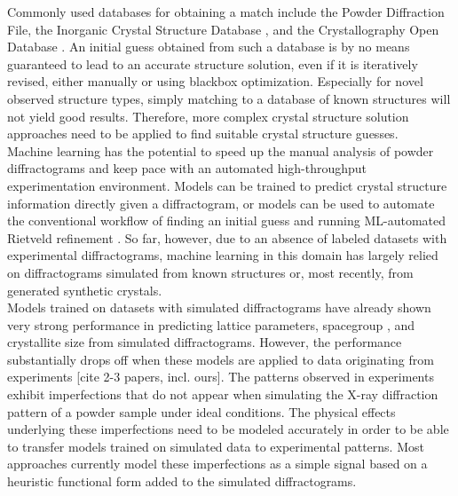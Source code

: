 Commonly used databases for obtaining a match include the Powder Diffraction File\cite{GatesRector2019}, the Inorganic Crystal Structure Database \cite{Belsky2002}, and the Crystallography Open Database \cite{Grazulis2009}. An initial guess obtained from such a database is by no means guaranteed to lead to an accurate structure solution, even if it is iteratively revised, either manually or using blackbox optimization\cite{Ozaki2020}. Especially for novel observed structure types, simply matching to a database of known structures will not yield good results. Therefore, more complex crystal structure solution approaches need to be applied to find suitable crystal structure guesses. \\

Machine learning has the potential to speed up the manual analysis of powder diffractograms and keep pace with an automated high-throughput experimentation environment\cite{Agrawal2019, Surdu2023}.
Models can be trained to predict crystal structure information directly given a diffractogram, or models can be used to automate the conventional workflow of finding an initial guess \cite{Surdu2023} and running ML-automated Rietveld refinement \cite{Feng2019}.
So far, however, due to an absence of labeled datasets with experimental diffractograms\cite{Wang2020}, machine learning in this domain has largely relied on diffractograms simulated from known structures\cite{Park2017, Lee2023} or, most recently, from generated synthetic crystals\cite{Schopmans2023}. \\

Models trained on datasets with simulated diffractograms have already shown very strong performance in predicting lattice parameters\cite{Dong2021, Chitturi2021, Habershon2004, zhang2024crystallographic}, spacegroup \cite{Schopmans2023, Oviedo2018, Park2017, Vecsei2018, Zaloga2020, Suzuki2020, Chakraborty2021,zhang2024crystallographic}, and crystallite size \cite{Dong2021, Chakraborty2021} from simulated diffractograms.
However, the performance substantially drops off when these models are applied to data originating from experiments \cite{Schopmans2023,zhang2024crystallographic}[cite 2-3 papers, incl. ours].
The patterns observed in experiments exhibit imperfections that do not appear when simulating the X-ray diffraction pattern of a powder sample under ideal conditions. The physical effects underlying these imperfections need to be modeled accurately in order to be able to transfer models trained on simulated data to experimental patterns. Most approaches currently model these imperfections as a simple signal based on a heuristic functional form added to the simulated diffractograms.\\

